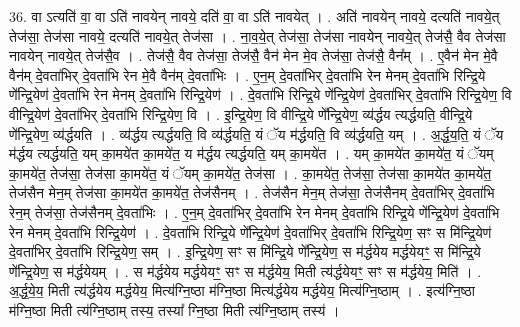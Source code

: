 \documentclass[17pt]{extarticle}
\begin{document}
36. वा ऽत्यति॑ वा॒ वा ऽति॑ नावयेन् नावये॒ दति॑ वा॒ वा ऽति॑ नावयेत् । . अति॑ नावयेन् नावये॒ दत्यति॑ नावये॒त् तेज॑सा॒ तेज॑सा नावये॒ दत्यति॑ नावये॒त् तेज॑सा । . ना॒व॒ये॒त् तेज॑सा॒ तेज॑सा नावयेन् नावये॒त् तेज॑सै॒ वैव तेज॑सा नावयेन् नावये॒त् तेज॑सै॒व । . तेज॑सै॒ वैव तेज॑सा॒ तेज॑सै॒ वैन॑ मेन मे॒व तेज॑सा॒ तेज॑सै॒ वैन᳚म् । . ए॒वैन॑ मेन मे॒वै वैन॑म् दे॒वता॑भिर् दे॒वता॑भि रेन मे॒वै वैन॑म् दे॒वता॑भिः । . ए॒न॒म् दे॒वता॑भिर् दे॒वता॑भि रेन मेनम् दे॒वता॑भि रिन्द्रि॒ये णे᳚न्द्रि॒येण॑ दे॒वता॑भि रेन मेनम् दे॒वता॑भि रिन्द्रि॒येण॑ । . दे॒वता॑भि रिन्द्रि॒ये णे᳚न्द्रि॒येण॑ दे॒वता॑भिर् दे॒वता॑भि रिन्द्रि॒येण॒ वि वीन्द्रि॒येण॑ दे॒वता॑भिर् दे॒वता॑भि रिन्द्रि॒येण॒ वि । . इ॒न्द्रि॒येण॒ वि वीन्द्रि॒ये णे᳚न्द्रि॒येण॒ व्य॑र्द्धय त्यर्द्धयति॒ वीन्द्रि॒ये णे᳚न्द्रि॒येण॒ व्य॑र्द्धयति । . व्य॑र्द्धय त्यर्द्धयति॒ वि व्य॑र्द्धयति॒ यं ॅय म॑र्द्धयति॒ वि व्य॑र्द्धयति॒ यम् । . अ॒र्द्ध॒य॒ति॒ यं ॅय म॑र्द्धय त्यर्द्धयति॒ यम् का॒मये॑त का॒मये॑त॒ य म॑र्द्धय त्यर्द्धयति॒ यम् का॒मये॑त । . यम् का॒मये॑त का॒मये॑त॒ यं ॅयम् का॒मये॑त॒ तेज॑सा॒ तेज॑सा का॒मये॑त॒ यं ॅयम् का॒मये॑त॒ तेज॑सा । . का॒मये॑त॒ तेज॑सा॒ तेज॑सा का॒मये॑त का॒मये॑त॒ तेज॑सैन मेन॒म् तेज॑सा का॒मये॑त का॒मये॑त॒ तेज॑सैनम् । . तेज॑सैन मेन॒म् तेज॑सा॒ तेज॑सैनम् दे॒वता॑भिर् दे॒वता॑भि रेन॒म् तेज॑सा॒ तेज॑सैनम् दे॒वता॑भिः । . ए॒न॒म् दे॒वता॑भिर् दे॒वता॑भि रेन मेनम् दे॒वता॑भि रिन्द्रि॒ये णे᳚न्द्रि॒येण॑ दे॒वता॑भि रेन मेनम् दे॒वता॑भि रिन्द्रि॒येण॑ । . दे॒वता॑भि रिन्द्रि॒ये णे᳚न्द्रि॒येण॑ दे॒वता॑भिर् दे॒वता॑भि रिन्द्रि॒येण॒ सꣳ स मि॑न्द्रि॒येण॑ दे॒वता॑भिर् दे॒वता॑भि रिन्द्रि॒येण॒ सम् । . इ॒न्द्रि॒येण॒ सꣳ स मि॑न्द्रि॒ये णे᳚न्द्रि॒येण॒ स म॑र्द्धयेय मर्द्धयेयꣳ॒॒ स मि॑न्द्रि॒ये णे᳚न्द्रि॒येण॒ स म॑र्द्धयेयम् । . स म॑र्द्धयेय मर्द्धयेयꣳ॒॒ सꣳ स म॑र्द्धयेय॒ मिती त्य॑र्द्धयेयꣳ॒॒ सꣳ स म॑र्द्धयेय॒ मिति॑ । . अ॒र्द्ध॒ये॒य॒ मिती त्य॑र्द्धयेय मर्द्धयेय॒ मित्य॑ग्नि॒ष्ठा म॑ग्नि॒ष्ठा मित्य॑र्द्धयेय मर्द्धयेय॒ मित्य॑ग्नि॒ष्ठाम् । . इत्य॑ग्नि॒ष्ठा म॑ग्नि॒ष्ठा मिती त्य॑ग्नि॒ष्ठाम् तस्य॒ तस्या᳚ ग्नि॒ष्ठा मिती त्य॑ग्नि॒ष्ठाम् तस्य॑ । \newline
\pagebreak
{}
\end{document}
